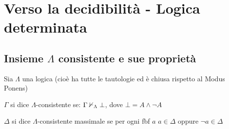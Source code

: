 
\chapter{Verso la decidibilità - Logica determinata}


\section{Insieme $\Lambda$ consistente e sue proprietà}

Sia $\Lambda$ una logica (cioè ha tutte le tautologie ed è chiusa
rispetto al Modus Ponens)

$\Gamma$ si dice $\Lambda$-consistente se: $\Gamma\nvdash_{\Lambda}\bot$,
dove $\bot=A\wedge\neg A$

$\Delta$ si dice $\Lambda$-consistente massimale se per ogni fbf
$a$ $a\in\Delta$ oppure $\neg a\in\Delta$ $ $\\



